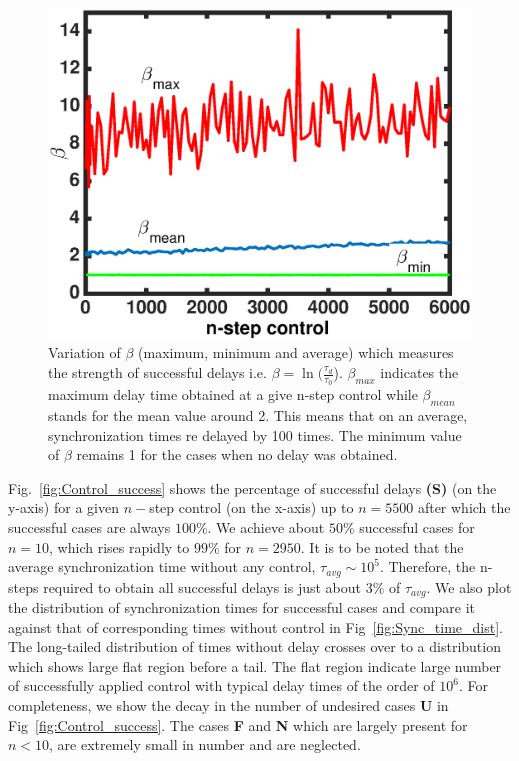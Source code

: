 \documentclass[reprint,superscriptaddress,amsmath,amssymb,aps,pre]{revtex4-1}
\begin{document}
\begin{figure}[b]
    \includegraphics[scale=0.45]{Strength_con.eps}
    \caption{\label{fig:Strength_con}\footnotesize Variation of $\beta$ 
        (maximum, minimum and average) which measures the strength of 
        successful 
        delays i.e. $\beta = \ln(\frac{\tau_d}{\tau_0}$). $\beta_{max}$ 
        indicates the maximum delay time obtained at a give n-step control 
        while $\beta_{mean}$ stands for the mean value around 2. This means 
        that on an average, synchronization times re delayed by 100 times. The 
        minimum value of $\beta$ remains 1 for the cases when no delay was 
        obtained. }
\end{figure}

Fig.~\ref{fig:Control_success} shows the percentage of successful delays 
\textbf{(S)} (on the y-axis) for a given $n-$step control (on the x-axis) up 
to $n = 5500$ after which the successful cases are always $100\%$.  We achieve 
about $50\%$ successful cases for $n = 10$, which rises rapidly to $99\%$ for 
$n = 2950$. It is to be noted that the average synchronization time without 
any control, $\tau_{avg} \sim 10^5$. Therefore, the n-steps required to obtain 
all successful delays is just about $3\%$ of $\tau_{avg}$. We also plot the 
distribution of synchronization times for successful cases and compare it 
against that of corresponding times without control in 
Fig~\ref{fig:Sync_time_dist}. The long-tailed 
distribution of times without delay crosses over to a distribution which shows 
large flat region before a tail. The flat region indicate large number of 
successfully applied control with typical delay times of the order of $10^6$. 
For completeness, we show the decay in the number of undesired cases 
\textbf{U} in Fig~\ref{fig:Control_success}.  The cases \textbf{F} and 
\textbf{N} which are largely present for $n<10$, are extremely small in number 
and are neglected.
\end{document}
